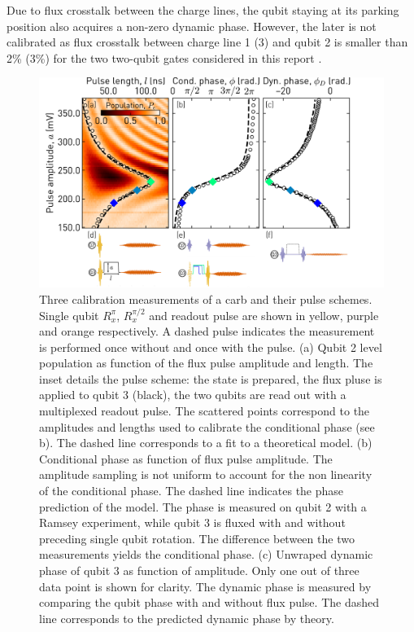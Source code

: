 Due to flux crosstalk between the charge lines, the qubit staying at its parking position also acquires a non-zero dynamic phase. However, the later is not calibrated as flux crosstalk between charge line 1 (3) and qubit 2 is smaller than 2\% (3\%) for the two two-qubit gates considered in this report \cite{Andersen2018SampleB4QP3}.

\begin{figure}
    \centering
    \includegraphics[width=\textwidth]{chapters/carb_gate/figs/ch4_carb_calibration_20200122_174703_with_pulses.png}
    \caption{Three calibration measurements of a \gls{carb} and their pulse schemes. Single qubit $R_x^\pi$, $R_x^{\pi/2}$ and readout pulse are shown in yellow, purple and orange respectively. A dashed pulse indicates the measurement is performed once without and once with the pulse. (a) Qubit 2 \e level population as function of the flux pulse amplitude and length. The inset details the pulse scheme: the \oo state is prepared, the flux pluse is  applied to qubit 3 (black), the two qubits are read out with a multiplexed readout pulse. The scattered points correspond to the amplitudes and lengths used to calibrate the conditional phase (see b). The dashed line corresponds to a fit to a theoretical model. (b) Conditional phase as function of flux pulse amplitude. The amplitude sampling is not uniform to account for the non linearity of the conditional phase. The dashed line indicates the phase prediction of the model. The phase is measured on qubit 2 with a Ramsey experiment, while qubit 3 is fluxed with and without preceding single qubit rotation. The difference between the two measurements yields the conditional phase. (c) Unwraped dynamic phase of qubit 3 as function of amplitude. Only one out of three data point is shown for clarity. The dynamic phase is measured by comparing the qubit phase with and without flux pulse. The dashed line corresponds to the predicted dynamic phase by theory.}
    \label{fig:ch4_calibration_carb}
\end{figure}

